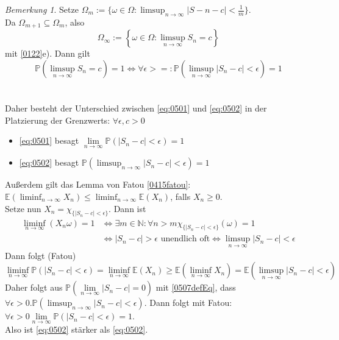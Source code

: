 \documentclass[10pt,a4paper]{article}
\newcommand{\N}{\ensuremath{\mathbb{N}}}
\newcommand{\abs}[1]{\left|#1\right|}
\newcommand{\Prb}{\mathbb P}
\newcommand{\Epv}{\ensuremath{\mathbb{E}}}
\theoremstyle{plain}
\theoremstyle{definition}
\theoremstyle{remark}
\newtheorem{bem}[theorem]{Bemerkung}
\begin{document}
	\begin{bem}\label{0508bem}
		Setze $\Omega_m:=\{\omega\in\Omega:\limsup_{n\to\infty}\abs{S-n-c}<\frac{1}{m}\}$.\\
		Da $\Omega_{m+1}\subseteq\Omega_m$, also 
		\[\Omega_\infty:=\left\{\omega\in\Omega:\limsup_{n\to\infty}S_n=c\right\}\]
		mit \ref{0122}e). Dann gilt
		\[\Prb\left(\limsup_{n\to\infty} S_n=c\right)=1\Leftrightarrow \forall\epsilon>=:\Prb\left(\limsup_{n\to\infty}\abs{S_n-c}<\epsilon\right)=1\tag{\star\star\star}\label{0507defEq}\]\\
		\\
		Daher besteht der Unterschied zwischen \ref{eq:0501} und \ref{eq:0502} in der Platzierung der Grenzwerts: $\forall\epsilon,c>0$
		\begin{itemize}
			\item \ref{eq:0501} besagt $\lim\limits_{n\to\infty}\Prb\left(\abs{S_n-c}<\epsilon\right)=1$
			\item \ref{eq:0502} besagt 
			$\Prb\left(\limsup_{n\to\infty}\abs{S_n-c}<\epsilon\right)=1$
		\end{itemize}
		Außerdem gilt das Lemma von Fatou \ref{0415fatou}: $\Epv\left(\liminf_{n\to\infty} X_n\right)\leq\liminf_{n\to\infty}\Epv(X_n)$, falls $X_n\geq 0$.\\
		Setze nun $X_n=\chi_{\{\abs{S_n-c}<\epsilon\}}$. Dann ist
		\begin{align*}
		\liminf_{n\to\infty}(X_n\omega)=1&\Leftrightarrow \exists m\in\N:\forall n>m\chi_{\{\abs{S_n-c}<\epsilon\}}(\omega)=1\\
		&\Leftrightarrow\abs{S_n-c}>\epsilon\text{ unendlich oft}\Leftrightarrow\limsup_{n\to\infty}\abs{S_n-c}<\epsilon
		\end{align*}
		Dann folgt (Fatou)
		\[\liminf_{n\to\infty}\Prb(\abs{S_n-c}<\epsilon)=\liminf_{n\to\infty}\Epv(X_n)\geq \Epv\left(\liminf_{n\to\infty}X_n\right)=\Epv\left(\limsup_{n\to\infty}\abs{S_n-c}<\epsilon\right)\]
		Daher folgt aus $\Prb\left(\lim\limits_{n\to\infty}\abs{S_n-c}=0\right)$ mit \ref{0507defEq}, dass $\forall\epsilon>0.\Prb\left(\limsup_{n\to\infty}\abs{S_n-c}<\epsilon\right)$.
		Dann folgt mit Fatou: $\forall\epsilon>0\lim\limits_{n\to\infty}\Prb\left(\abs{ S_n-c}<\epsilon\right)=1$.\\
		Also ist \ref{eq:0502} stärker als \ref{eq:0502}.
	\end{bem}
	
\end{document}
